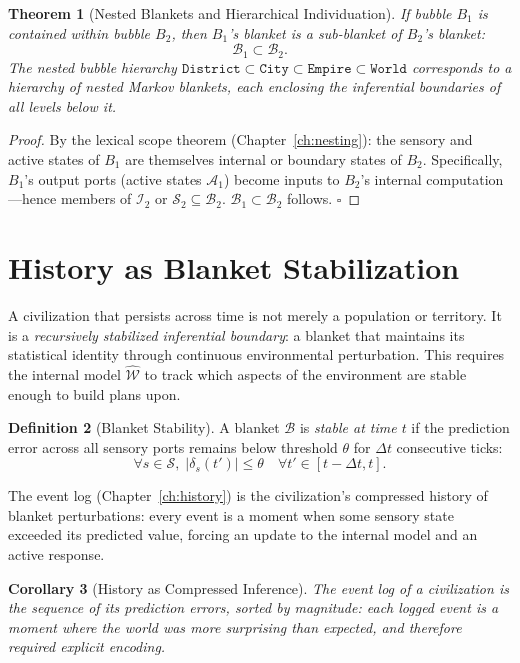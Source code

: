 \documentclass[11pt,a4paper,openany]{book}
\theoremstyle{plain}
\newtheorem{theorem}{Theorem}[chapter]
\newtheorem{corollary}[theorem]{Corollary}
\theoremstyle{definition}
\newtheorem{definition}[theorem]{Definition}
\theoremstyle{remark}
\newcommand{\world}{\ensuremath{\mathcal{W}}}
\begin{document}
\begin{theorem}[Nested Blankets and Hierarchical Individuation]
  If bubble $B_1$ is contained within bubble $B_2$, then $B_1$'s blanket
  is a sub-blanket of $B_2$'s blanket:
  \[
    \mathcal{B}_1 \subset \mathcal{B}_2.
  \]
  The nested bubble hierarchy
  $\texttt{District} \subset \texttt{City} \subset \texttt{Empire}
  \subset \texttt{World}$
  corresponds to a hierarchy of nested Markov blankets, each enclosing
  the inferential boundaries of all levels below it.
\end{theorem}
\begin{proof}
  By the lexical scope theorem (Chapter~\ref{ch:nesting}): the sensory
  and active states of $B_1$ are themselves internal or boundary states
  of $B_2$. Specifically, $B_1$'s output ports (active states $\mathcal{A}_1$)
  become inputs to $B_2$'s internal computation---hence members of
  $\mathcal{I}_2$ or $\mathcal{S}_2 \subseteq \mathcal{B}_2$.
  $\mathcal{B}_1 \subset \mathcal{B}_2$ follows. $\square$
\end{proof}

\section{History as Blanket Stabilization}

A civilization that persists across time is not merely a population
or territory. It is a \emph{recursively stabilized inferential boundary}:
a blanket that maintains its statistical identity through continuous
environmental perturbation. This requires the internal model $\hat{\world}$
to track which aspects of the environment are stable enough to build
plans upon.

\begin{definition}[Blanket Stability]
  A blanket $\mathcal{B}$ is \emph{stable at time $t$} if the
  prediction error across all sensory ports remains below threshold
  $\theta$ for $\Delta t$ consecutive ticks:
  \[
    \forall s \in \mathcal{S},\; |\delta_s(t')| \leq \theta
    \quad \forall t' \in [t - \Delta t, t].
  \]
\end{definition}

The event log (Chapter~\ref{ch:history}) is the civilization's
compressed history of blanket perturbations: every event is a moment
when some sensory state exceeded its predicted value, forcing an
update to the internal model and an active response.

\begin{corollary}[History as Compressed Inference]
  The event log of a civilization is the sequence of its prediction
  errors, sorted by magnitude: each logged event is a moment where
  the world was \emph{more surprising than expected}, and therefore
  required explicit encoding.
\end{corollary}
\end{document}
